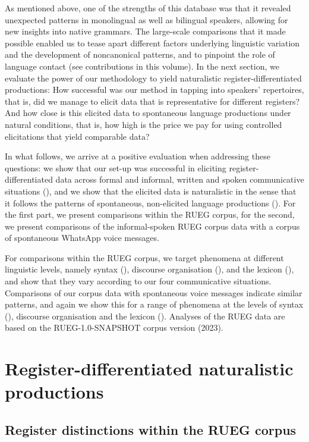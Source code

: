 \documentclass[output=paper,colorlinks,citecolor=brown]{langscibook}
\begin{document}
As mentioned above, one of the strengths of this database was that it revealed unexpected patterns in monolingual as well as bilingual speakers, allowing for new insights into native grammars. The large-scale comparisons that it made possible enabled us to tease apart different factors underlying linguistic variation and the development of noncanonical patterns, and to pinpoint the role of language contact (see contributions in this volume). In the next section, we evaluate the power of our methodology to yield naturalistic register\hyp differentiated productions: How successful was our method in tapping into speakers’ repertoires, that is, did we manage to elicit data that is representative for different registers? And how close is this elicited data to spontaneous language productions under natural conditions, that is, how high is the price we pay for using controlled elicitations that yield comparable data?

In what follows, we arrive at a positive evaluation when addressing these questions: we show that our set-up was successful in eliciting register-differentiated data across formal and informal, written and spoken communicative situations (), and we show that the elicited data is naturalistic in the sense that it follows the patterns of spontaneous, non-elicited language productions (). For the first part, we present comparisons within the RUEG corpus, for the second, we present comparisons of the informal-spoken RUEG corpus data with a corpus of spontaneous WhatsApp voice messages.

For comparisons within the RUEG corpus, we target phenomena at different linguistic levels, namely syntax (), discourse organisation (), and the lexicon (), and show that they vary according to our four communicative situations. Comparisons of our corpus data with spontaneous voice messages indicate similar patterns, and again we show this for a range of phenomena at the levels of syntax (), discourse organisation and the lexicon (). Analyses of the RUEG data are based on the RUEG-1.0-SNAPSHOT corpus version (2023).

\section{Register-differentiated naturalistic productions} \label{ch1:sec:3}
\subsection{Register distinctions within the RUEG corpus} \label{ch1:sec:3.1}
\end{document}
